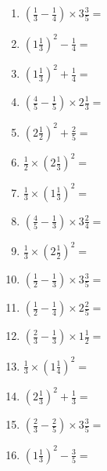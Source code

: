 \documentclass[12pt]{article}
\begin{document}
\begin{enumerate}
\item \large $ \left( \frac{1}{3} - \frac{1}{4} \right) \times 3 \frac{3}{5} = $ \vspace{1.6cm}
\item \large $ \left( 1 \frac{1}{3} \right)^2 - \frac{1}{4} = $ \vspace{1.6cm}
\item \large $ \left( 1 \frac{1}{3} \right)^2 + \frac{1}{4} = $ \vspace{1.6cm}
\item \large $ \left( \frac{4}{5} - \frac{1}{5} \right) \times 2 \frac{1}{3} = $ \vspace{1.6cm}
\item \large $ \left( 2 \frac{1}{2} \right)^2 + \frac{2}{5} = $ \vspace{1.6cm}
\item \large $ \frac{1}{2} \times \left( 2 \frac{1}{3} \right)^2 = $ \vspace{1.6cm}
\item \large $ \frac{1}{3} \times \left( 1 \frac{1}{3} \right)^2 = $ \vspace{1.6cm}
\item \large $ \left( \frac{4}{5} - \frac{1}{3} \right) \times 3 \frac{2}{4} = $ \vspace{1.6cm}
\item \large $ \frac{1}{3} \times \left( 2 \frac{1}{2} \right)^2 = $ \vspace{1.6cm}
\item \large $ \left( \frac{1}{2} - \frac{1}{3} \right) \times 3 \frac{3}{5} = $ \vspace{1.6cm}
\newpage
\item \large $ \left( \frac{1}{2} - \frac{1}{4} \right) \times 2 \frac{2}{5} = $ \vspace{1.6cm}
\item \large $ \left( \frac{2}{3} - \frac{1}{3} \right) \times 1 \frac{1}{2} = $ \vspace{1.6cm}
\item \large $ \frac{1}{3} \times \left( 1 \frac{1}{4} \right)^2 = $ \vspace{1.6cm}
\item \large $ \left( 2 \frac{1}{3} \right)^2 + \frac{1}{3} = $ \vspace{1.6cm}
\item \large $ \left( \frac{2}{3} - \frac{2}{5} \right) \times 3 \frac{3}{5} = $ \vspace{1.6cm}
\item \large $ \left( 1 \frac{1}{3} \right)^2 - \frac{3}{5} = $ \vspace{1.6cm}

\end{enumerate}
\end{document}
